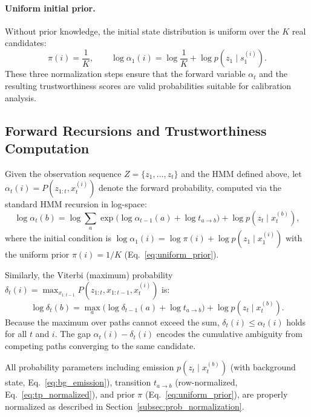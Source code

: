 \documentclass[letterpaper,journal]{IEEEtran}
\begin{document}
\paragraph{Uniform initial prior.}
Without prior knowledge, the initial state distribution is uniform over
the $K$ real candidates:
\begin{equation}
\pi(i) = \frac{1}{K}, \qquad
\log \alpha_1(i) = \log\frac{1}{K} + \log p(z_1 \mid s_1^{(i)}).
\label{eq:uniform_prior}
\end{equation}
These three normalization steps ensure that the forward variable
$\alpha_t$ and the resulting trustworthiness scores are valid probabilities
suitable for calibration analysis.

\subsection{Forward Recursions and Trustworthiness Computation}

Given the observation sequence $Z=\{z_1,\ldots,z_t\}$ and the HMM
defined above, let $\alpha_t(i) = P(z_{1:t}, x_t^{(i)})$ denote the
forward probability, computed via the standard HMM recursion in
log-space:
\begin{equation}
\log \alpha_t(b)
= \log \sum_{a} \exp\!\big(\log \alpha_{t-1}(a) + \log t_{a \to b}\big)
+ \log p(z_t \mid x_t^{(b)}),
\label{eq:log_forward}
\end{equation}
where the initial condition is
$\log \alpha_1(i) = \log\pi(i) + \log p(z_1 \mid x_1^{(i)})$ with the
uniform prior $\pi(i) = 1/K$ (Eq.~\eqref{eq:uniform_prior}).

Similarly, the Viterbi (maximum) probability
$\delta_t(i) = \max_{x_{1:t-1}} P(z_{1:t}, x_{1:t-1}, x_t^{(i)})$
is:
\begin{equation}
\log \delta_t(b)
= \max_{a}\!\big(\log \delta_{t-1}(a) + \log t_{a \to b}\big)
+ \log p(z_t \mid x_t^{(b)}).
\label{eq:log_viterbi}
\end{equation}
Because the maximum over paths cannot exceed the sum,
$\delta_t(i) \leq \alpha_t(i)$ holds for all $t$ and $i$. The gap
$\alpha_t(i) - \delta_t(i)$ encodes the cumulative ambiguity from
competing paths converging to the same candidate.

All probability parameters including emission $p(z_t \mid x_t^{(b)})$ (with
background state, Eq.~\eqref{eq:bg_emission}), transition
$t_{a \to b}$ (row-normalized, Eq.~\eqref{eq:tp_normalized}), and
prior $\pi$ (Eq.~\eqref{eq:uniform_prior}), are properly normalized
as described in Section~\ref{subsec:prob_normalization}.
\end{document}
